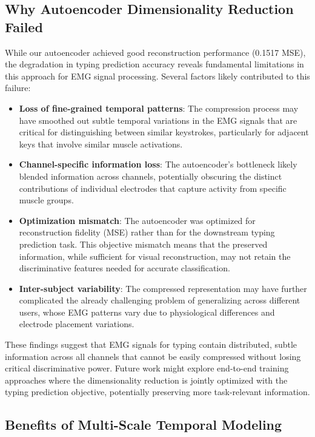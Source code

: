 \subsection{Why Autoencoder Dimensionality Reduction Failed}

While our autoencoder achieved good reconstruction performance (0.1517 MSE), the degradation in typing prediction accuracy reveals fundamental limitations in this approach for EMG signal processing. Several factors likely contributed to this failure:

\begin{itemize}
    \item \textbf{Loss of fine-grained temporal patterns}: The compression process may have smoothed out subtle temporal variations in the EMG signals that are critical for distinguishing between similar keystrokes, particularly for adjacent keys that involve similar muscle activations.

    \item \textbf{Channel-specific information loss}: The autoencoder's bottleneck likely blended information across channels, potentially obscuring the distinct contributions of individual electrodes that capture activity from specific muscle groups.

    \item \textbf{Optimization mismatch}: The autoencoder was optimized for reconstruction fidelity (MSE) rather than for the downstream typing prediction task. This objective mismatch means that the preserved information, while sufficient for visual reconstruction, may not retain the discriminative features needed for accurate classification.

    \item \textbf{Inter-subject variability}: The compressed representation may have further complicated the already challenging problem of generalizing across different users, whose EMG patterns vary due to physiological differences and electrode placement variations.
\end{itemize}

These findings suggest that EMG signals for typing contain distributed, subtle information across all channels that cannot be easily compressed without losing critical discriminative power. Future work might explore end-to-end training approaches where the dimensionality reduction is jointly optimized with the typing prediction objective, potentially preserving more task-relevant information.

\subsection{Benefits of Multi-Scale Temporal Modeling}

